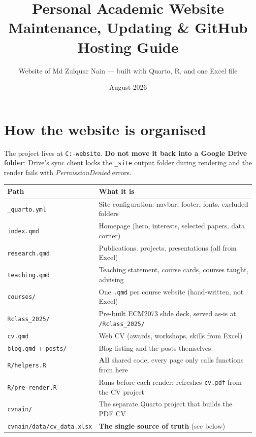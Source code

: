 \documentclass[11pt,a4paper]{article}
\title{\textbf{Personal Academic Website}\\[4pt]
\Large Maintenance, Updating \& GitHub Hosting Guide}
\author{Website of Md Zulquar Nain --- built with Quarto, R, and one Excel file}
\date{August 2026}
\newcommand{\file}[1]{\texttt{#1}}
\begin{document}
\maketitle
\tableofcontents
\bigskip

\section{How the website is organised}

The project lives at \file{C:\string\Users\string\Abc\string\Desktop\string\academic-website}.
\textbf{Do not move it back into a Google Drive folder}: Drive's sync client
locks the \file{\_site} output folder during rendering and the render fails
with \emph{PermissionDenied} errors.

\begin{center}
\begin{tabular}{@{}ll@{}}
\toprule
\textbf{Path} & \textbf{What it is} \\
\midrule
\file{\_quarto.yml}            & Site configuration: navbar, footer, fonts, excluded folders \\
\file{index.qmd}               & Homepage (hero, interests, selected papers, data corner) \\
\file{research.qmd}            & Publications, projects, presentations (all from Excel) \\
\file{teaching.qmd}            & Teaching statement, course cards, courses taught, advising \\
\file{courses/}                & One \file{.qmd} per course website (hand-written, not Excel) \\
\file{Rclass\_2025/}           & Pre-built ECM2073 slide deck, served as-is at \file{/Rclass\_2025/} \\
\file{cv.qmd}                  & Web CV (awards, workshops, skills from Excel) \\
\file{blog.qmd} + \file{posts/} & Blog listing and the posts themselves \\
\file{R/helpers.R}             & \textbf{All} shared code; every page only calls functions from here \\
\file{R/pre-render.R}          & Runs before each render; refreshes \file{cv.pdf} from the CV project \\
\file{cvnain/}                 & The separate Quarto project that builds the PDF CV \\
\file{cvnain/data/cv\_data.xlsx} & \textbf{The single source of truth} (see below) \\

\end{tabular}
\end{center}
\end{document}
